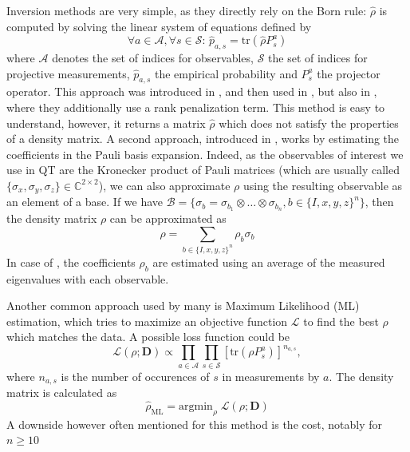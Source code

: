 \documentclass[12pt]{memoir}
\newcommand{\tr}{\text{tr}}
\newcommand{\mb}{\mathbf}
\begin{document}
Inversion methods are very simple, as they directly rely on the Born rule: $\hat \rho$ is computed by solving the linear system of equations defined by 
\begin{equation*} \label{eq:inversion-method}
        \forall a \in \mathcal{A},\forall s \in \mathcal{S}: \, \hat p_{a,s} = \tr(\hat \rho P^a_s)
\end{equation*}
where $\mathcal{A}$ denotes the set of indices for observables, $\mathcal{S}$ the set of indices for projective measurements, $\hat p_{a,s}$ the empirical probability and $P^a_s$ the projector operator. This approach was introduced in \cite{meth:linear-inversion:vogel-risken}, and then used in \cite{meth:linear-inversion:RMH}, but also in \cite{meth:linear-inversion:alquier}, where they additionally use a rank penalization term. This method is easy to understand, however, it returns a matrix $\hat \rho$ which does not satisfy the properties of a density matrix.\medbreak
A second approach, introduced in \cite{Cai-2016}, works by estimating the coefficients in the Pauli basis expansion. Indeed, as the observables of interest we use in QT are the Kronecker product of Pauli matrices (which are usually called $\{\sigma_x, \sigma_y, \sigma_z\} \in \mathbb{C}^{2\times 2}$), we can also approximate $\rho$ using the resulting observable as an element of a base. If we have $\mathcal{B} = \{\sigma_b = \sigma_{b_1} \otimes \dots \otimes \sigma_{b_n}, b \in \{I,x,y,z\}^n\}$, then the density matrix $\rho$ can be approximated as 
\begin{equation}
    \rho = \sum_{b\in\{I,x,y,z\}^n} \rho_b \sigma_b
\end{equation}
In case of \cite{Cai-2016}, the coefficients $\rho_b$ are estimated using an average of the measured eigenvalues with each observable.\medbreak

Another common approach used by many \cite{Guta20,meth:ML:BDP,meth:ML:JKMW,meth:ML:Lvovsky,meth:ML:Blume-Kohout,meth:ML:Suzuki,meth:ML:Hradil2004} is Maximum Likelihood (ML) estimation, which tries to maximize an objective function $\mathcal{L}$ to find the best $\rho$ which matches the data. A possible loss function could be 
\begin{equation}
\mathcal{L}(\rho ; \mb{D}) \propto \prod_{a \in \mathcal{A}} \prod_{s \in \mathcal{S}}\left[\tr\left(\rho P_{{s}}^{{a}}\right)\right]^{n_{{a}, {s}}},
\end{equation}
where $n_{a,s}$ is the number of occurences of $s$ in measurements by $a$. The density matrix is calculated as 
\begin{equation}
    \hat \rho_{\text{ML}} = \text{argmin}_{\rho} \;\mathcal{L}(\rho;\mb{D})
\end{equation}
A downside however often mentioned for this method is the cost, notably for $n\geq10$
\medbreak
\end{document}
